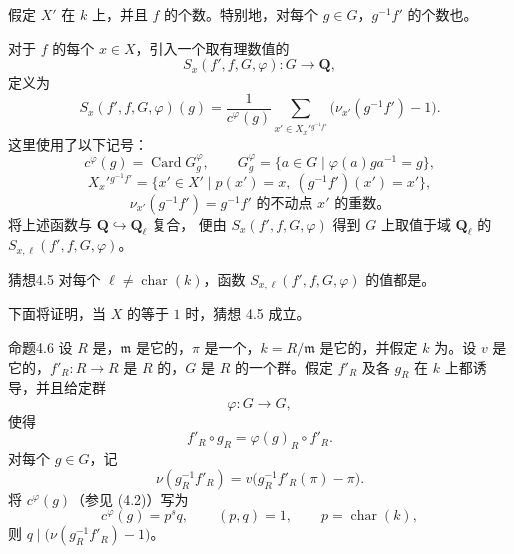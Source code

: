 假定 $X'$ 在 $k$ 上，并且 $f$ 的个数。特别地，对每个 $g\in G$，$g^{-1}f'$ 的个数也。

对于 $f$ 的每个 $x\in X$，引入一个取有理数值的
\[
S_x(f',f,G,\varphi):G\longrightarrow\mathbf Q,
\]
定义为
\[
S_x(f',f,G,\varphi)(g)
=\frac{1}{c^\varphi(g)}\sum_{x'\in X_x'{}^{g^{-1}f'}}
 \bigl(\nu_{x'}(g^{-1}f')-1\bigr).
\tag{4.1}
\]
这里使用了以下记号：
\[
c^\varphi(g)=\operatorname{Card}G_g^\varphi,\qquad
G_g^\varphi=\{a\in G\mid\varphi(a)ga^{-1}=g\},
\tag{4.2}
\]
\[
X_x'{}^{g^{-1}f'}
=\{x'\in X'\mid p(x')=x,\ (g^{-1}f')(x')=x'\},
\tag{4.3}
\]
\[
\nu_{x'}(g^{-1}f')=g^{-1}f'\text{ 的不动点 }x'\text{ 的重数。}
\tag{4.4}
\]
将上述函数与 $\mathbf Q\hookrightarrow\mathbf Q_\ell$ 复合，
便由 $S_x(f',f,G,\varphi)$ 得到 $G$ 上取值于域 $\mathbf Q_\ell$ 的
 $S_{x,\ell}(f',f,G,\varphi)$。

\begin{SGAresult}{猜想}{4.5}
对每个 $\ell\ne\operatorname{char}(k)$，函数 $S_{x,\ell}(f',f,G,\varphi)$ 的值都是。
\end{SGAresult}
下面将证明，当 $X$ 的等于 $1$ 时，猜想 4.5 成立。

\begin{SGAresult}{命题}{4.6}
设 $R$ 是，$\mathfrak m$ 是它的，$\pi$ 是一个，$k=R/\mathfrak m$ 是它的，并假定 $k$ 为。设 $v$ 是它的，$f'_R:R\longrightarrow R$ 是 $R$ 的，$G$ 是 $R$ 的一个群。假定 $f'_R$ 及各 $g_R$ 在 $k$ 上都诱导，并且给定群
\[
\varphi:G\longrightarrow G,
\]
使得
\[
f'_R\circ g_R=\varphi(g)_R\circ f'_R.
\]
对每个 $g\in G$，记
\[
\nu(g_R^{-1}f'_R)=v\bigl(g_R^{-1}f'_R(\pi)-\pi\bigr).
\]
将 $c^\varphi(g)$（参见 (4.2)）写为
\[
c^\varphi(g)=p^s q,\qquad(p,q)=1,\qquad p=\operatorname{char}(k),
\]
则 $q\mid\bigl(\nu(g_R^{-1}f'_R)-1\bigr)$。
\end{SGAresult}


